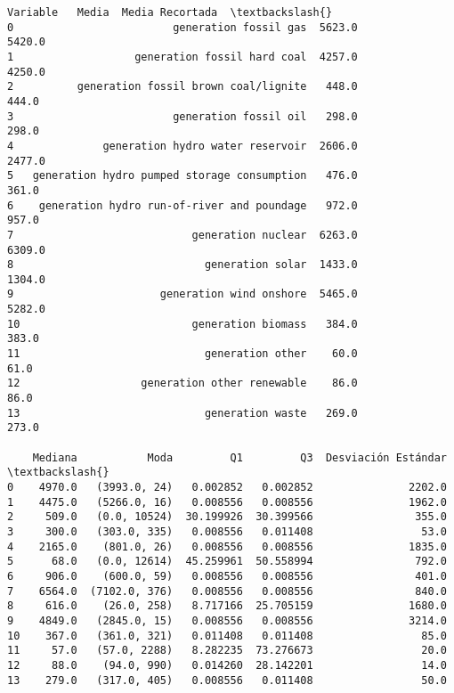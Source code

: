 \documentclass[11pt]{article}
\makeatletter
\newcommand{\boxspacing}{\kern\kvtcb@left@rule\kern\kvtcb@boxsep}
\newcommand{\prompt}[4]{
        {\ttfamily\llap{{\color{#2}[#3]:\hspace{3pt}#4}}\vspace{-\baselineskip}}
    }
\makeatother
\begin{document}
            \begin{tcolorbox}[breakable, size=fbox, boxrule=.5pt, pad at break*=1mm, opacityfill=0]
\prompt{Out}{outcolor}{75}{\boxspacing}
\begin{Verbatim}[commandchars=\\\{\}]
                                       Variable   Media  Media Recortada  \textbackslash{}
0                         generation fossil gas  5623.0           5420.0
1                   generation fossil hard coal  4257.0           4250.0
2          generation fossil brown coal/lignite   448.0            444.0
3                         generation fossil oil   298.0            298.0
4              generation hydro water reservoir  2606.0           2477.0
5   generation hydro pumped storage consumption   476.0            361.0
6    generation hydro run-of-river and poundage   972.0            957.0
7                            generation nuclear  6263.0           6309.0
8                              generation solar  1433.0           1304.0
9                       generation wind onshore  5465.0           5282.0
10                           generation biomass   384.0            383.0
11                             generation other    60.0             61.0
12                   generation other renewable    86.0             86.0
13                             generation waste   269.0            273.0

    Mediana           Moda         Q1         Q3  Desviación Estándar  \textbackslash{}
0    4970.0   (3993.0, 24)   0.002852   0.002852               2202.0
1    4475.0   (5266.0, 16)   0.008556   0.008556               1962.0
2     509.0   (0.0, 10524)  30.199926  30.399566                355.0
3     300.0   (303.0, 335)   0.008556   0.011408                 53.0
4    2165.0    (801.0, 26)   0.008556   0.008556               1835.0
5      68.0   (0.0, 12614)  45.259961  50.558994                792.0
6     906.0    (600.0, 59)   0.008556   0.008556                401.0
7    6564.0  (7102.0, 376)   0.008556   0.008556                840.0
8     616.0    (26.0, 258)   8.717166  25.705159               1680.0
9    4849.0   (2845.0, 15)   0.008556   0.008556               3214.0
10    367.0   (361.0, 321)   0.011408   0.011408                 85.0
11     57.0   (57.0, 2288)   8.282235  73.276673                 20.0
12     88.0    (94.0, 990)   0.014260  28.142201                 14.0
13    279.0   (317.0, 405)   0.008556   0.011408                 50.0


\end{Verbatim}
\end{tcolorbox}
\end{document}

